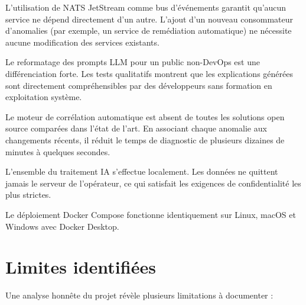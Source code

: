 \begin{description}[leftmargin=2cm]
  \item[Architecture découplée] L'utilisation de NATS JetStream comme bus
    d'événements garantit qu'aucun service ne dépend directement d'un autre.
    L'ajout d'un nouveau consommateur d'anomalies (par exemple, un service de
    remédiation automatique) ne nécessite aucune modification des services
    existants.
  \item[Explication en langage naturel ciblée] Le reformatage des prompts
    LLM pour un public non-DevOps est une différenciation forte. Les tests
    qualitatifs montrent que les explications générées sont directement
    compréhensibles par des développeurs sans formation en exploitation système.
  \item[Corrélation de changements] Le moteur de corrélation automatique
    est absent de toutes les solutions open source comparées dans l'état de l'art.
    En associant chaque anomalie aux changements récents, il réduit le temps
    de diagnostic de plusieurs dizaines de minutes à quelques secondes.
  \item[Zéro dépendance cloud] L'ensemble du traitement IA s'effectue localement.
    Les données ne quittent jamais le serveur de l'opérateur, ce qui satisfait
    les exigences de confidentialité les plus strictes.
  \item[Portabilité] Le déploiement Docker Compose fonctionne identiquement
    sur Linux, macOS et Windows avec Docker Desktop.
\end{description}

\section{Limites identifiées}

Une analyse honnête du projet révèle plusieurs limitations à documenter :

